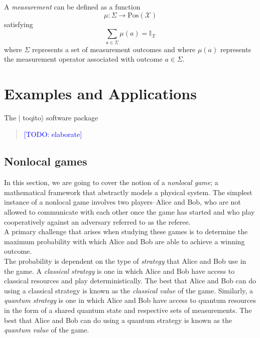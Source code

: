 \documentclass[nofootinbib,superscriptaddress,a4paper,twocolumn,longbibliography,floatfix,pra]{revtex4-2}
\newcommand{\comment}[1]{\begin{quote}\sf 
    \textcolor{blue}{[#1]}\end{quote}}
\newcommand{\I}{\mathbb{I}}
\newcommand{\setft}[1]{\mathrm{#1}}
\newcommand{\Pos}{\setft{Pos}}
\newcommand{\toqitofont}{%
	\fontfamily{FiraSans}%
	\selectfont}
\newcommand{\toqito}{ $|${\toqitofont toqito}$\rangle$\xspace}
\newcommand{\X}{\mathcal{X}}
\begin{document}
A \emph{measurement} can be defined as a function
\begin{equation}
    \mu: \Sigma \rightarrow \Pos(\X)
\end{equation}
satisfying
\begin{equation}
    \sum_{a \in \Sigma} \mu(a) = \I_{\X}
\end{equation}
where $\Sigma$ represents a set of measurement outcomes and where $\mu(a)$
represents the measurement operator associated with outcome $a \in \Sigma$.

\section{Examples and Applications}
\label{sec:examples_and_applications}

The \toqito software package \comment{TODO: elaborate}

\subsection{Nonlocal games}\label{sec:nonlocal_games}

In this section, we are going to cover the notion of a \emph{nonlocal game}; a
mathematical framework that abstractly models a physical system. The simplest
instance of a nonlocal game involves two players--Alice and Bob, who are not
allowed to communicate with each other once the game has started and who play
cooperatively against an adversary referred to as the referee. \\

A primary challenge that arises when studying these games is to determine the
maximum probability with which Alice and Bob are able to achieve a winning
outcome. \\

The probability is dependent on the type of \emph{strategy} that Alice and Bob
use in the game. A \emph{classical strategy} is one in which Alice and Bob have
access to classical resources and play deterministically. The best that Alice
and Bob can do using a classical strategy is known as the \emph{classical
value} of the game.  Similarly, a \emph{quantum strategy} is one in which Alice
and Bob have access to quantum resources in the form of a shared quantum state
and respective sets of measurements. The best that Alice and Bob can do using a
quantum strategy is known as the \emph{quantum value} of the game.
\\
\end{document}
